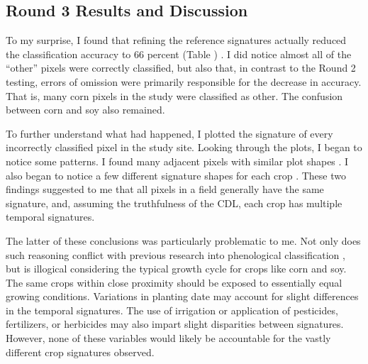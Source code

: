 

\subsection*{Round 3 Results and Discussion}



To my surprise, I found that refining the reference signatures actually reduced the classification accuracy to 66 percent (Table )
. I did notice almost all of the “other” pixels were correctly classified, but also that, in contrast to the Round 2 testing, errors of omission were primarily responsible for the decrease in accuracy. That is, many corn pixels in the study were classified as other. The confusion between corn and soy also remained.

To further understand what had happened, I plotted the signature of every incorrectly classified pixel in the study site. Looking through the plots, I began to notice some patterns. I found many adjacent pixels with similar plot shapes . I also began to notice a few different signature shapes for each crop . These two findings suggested to me that all pixels in a field generally have the same signature, and, assuming the truthfulness of the CDL, each crop has multiple temporal signatures.

The latter of these conclusions was particularly problematic to me. Not only does such reasoning conflict with previous research into phenological classification , but is illogical considering the typical growth cycle for crops like corn and soy. The same crops within close proximity should be exposed to essentially equal growing conditions. Variations in planting date may account for slight differences in the temporal signatures. The use of irrigation or application of pesticides, fertilizers, or herbicides may also impart slight disparities between signatures. However, none of these variables would likely be accountable for the vastly different crop signatures observed.

